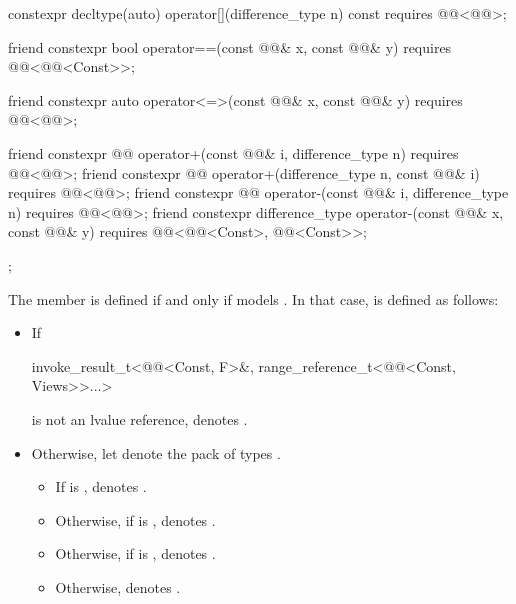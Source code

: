 \begin{codeblock}
{{    constexpr decltype(auto) operator[](difference_type n) const
      requires @@<@@>;

    friend constexpr bool operator==(const @@& x, const @@& y)
      requires @@<@@<Const>>;

    friend constexpr auto operator<=>(const @@& x, const @@& y)
      requires @@<@@>;

    friend constexpr @@ operator+(const @@& i, difference_type n)
      requires @@<@@>;
    friend constexpr @@ operator+(difference_type n, const @@& i)
      requires @@<@@>;
    friend constexpr @@ operator-(const @@& i, difference_type n)
      requires @@<@@>;
    friend constexpr difference_type operator-(const @@& x, const @@& y)
      requires @@<@@<Const>, @@<Const>>;
  };
}
\end{codeblock}

\pnum
The member 
is defined if and only if  models .
In that case,
 is defined as follows:
\begin{itemize}
\item
If
\begin{codeblock}
invoke_result_t<@@<Const, F>&, range_reference_t<@@<Const, Views>>...>
\end{codeblock}
is not an lvalue reference,
 denotes .
\item
Otherwise, let  denote the pack of types
.
\begin{itemize}
\item
If 
is ,
 denotes .
\item
Otherwise,
if 
is ,
 denotes .
\item
Otherwise,
if 
is ,
 denotes .
\item
Otherwise,  denotes .
\end{itemize}
\end{itemize}

